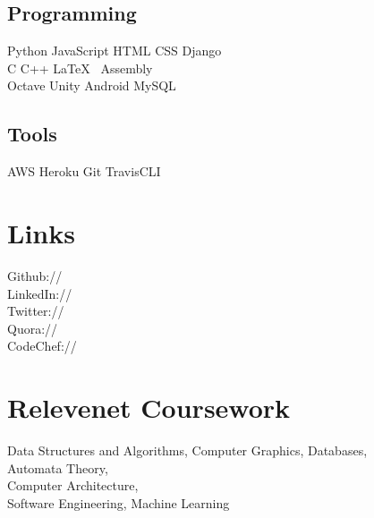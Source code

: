 \documentclass[]{openfont}
\begin{document}
\begin{minipage}[t]{0.33\textwidth}
\subsection{Programming}
Python \textbullet{} JavaScript \textbullet{} HTML \textbullet{} CSS \textbullet{} Django \textbullet{}  \\ 
C \textbullet{} C++ \textbullet{} \LaTeX\ \textbullet{} Assembly \\
Octave \textbullet{} Unity \textbullet{} Android \textbullet{} MySQL

\sectionsep
\subsection{Tools}
AWS \textbullet{} Heroku \textbullet{} Git \textbullet{} TravisCLI

\sectionsep


\section{Links} 
Github:// \href{https://github.com/rajujha373}{} \\
LinkedIn://  \href{https://www.linkedin.com/in/rajujha373}{} \\
Twitter://  \href{https://twitter.com/encipherer889}{} \\
Quora://  \href{https://www.quora.com/profile/Raju-Jha-3}{}\\
CodeChef:// \href{https://www.quora.com/encipherer889}{}
\sectionsep


\section{Relevenet Coursework}
Data Structures and
Algorithms, Computer
Graphics, Databases, \\
Automata Theory, \\
Computer Architecture, \\
Software Engineering, Machine
Learning 
\sectionsep


%
%

\end{minipage} 
\end{document}
